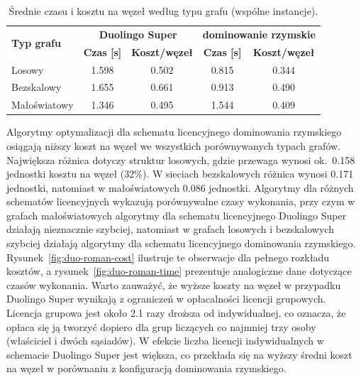 \begin{table}[H]
  \centering
  \caption{Średnie czasu i kosztu na węzeł według typu grafu (wspólne instancje).}
  \label{tab:duo-roman-graph}
  \begin{tabular}{lcccc}
    \toprule
    \multirow{2}{*}{\textbf{Typ grafu}} & \multicolumn{2}{c}{\textbf{Duolingo Super}} & \multicolumn{2}{c}{\textbf{dominowanie rzymskie}}                                            \\
                                        & \textbf{Czas [s]}                           & \textbf{Koszt/węzeł}                              & \textbf{Czas [s]} & \textbf{Koszt/węzeł} \\
    \midrule
    Losowy                              & 1.598                                       & 0.502                                             & 0.815             & 0.344                \\
    Bezskalowy                          & 1.655                                       & 0.661                                             & 0.913             & 0.490                \\
    Małoświatowy                        & 1.346                                       & 0.495                                             & 1.544             & 0.409                \\
    \bottomrule
  \end{tabular}
\end{table}

Algorytmy optymalizacji dla schematu licencyjnego dominowania rzymskiego osiągają niższy koszt na węzeł we wszystkich porównywanych typach grafów. Największa różnica dotyczy struktur losowych, gdzie przewaga wynosi ok.~0.158 jednostki kosztu na węzeł (32\%). W sieciach bezskalowych różnica wynosi 0.171 jednostki, natomiast w małoświatowych 0.086 jednostki. Algorytmy dla różnych schematów licencyjnych wykazują porównywalne czasy wykonania, przy czym w grafach małoświatowych algorytmy dla schematu licencyjnego Duolingo Super działają nieznacznie szybciej, natomiast w grafach losowych i bezskalowych szybciej działają algorytmy dla schematu licencyjnego dominowania rzymskiego. Rysunek~\ref{fig:duo-roman-cost} ilustruje te obserwacje dla pełnego rozkładu kosztów, a rysunek~\ref{fig:duo-roman-time} prezentuje analogiczne dane dotyczące czasów wykonania. Warto zauważyć, że wyższe koszty na węzeł w przypadku Duolingo Super wynikają z ograniczeń w opłacalności licencji grupowych. Licencja grupowa jest około 2.1 razy droższa od indywidualnej, co oznacza, że opłaca się ją tworzyć dopiero dla grup liczących co najmniej trzy osoby (właściciel i dwóch sąsiadów). W efekcie liczba licencji indywidualnych w schemacie Duolingo Super jest większa, co przekłada się na wyższy średni koszt na węzeł w porównaniu z konfiguracją dominowania rzymskiego.

